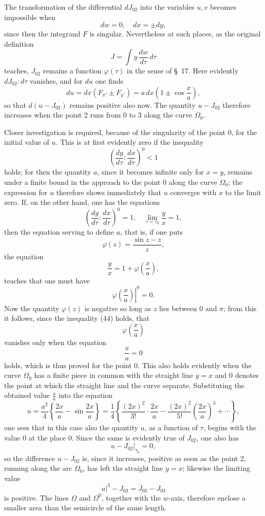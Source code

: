 \documentclass[11pt,a4paper,leqno]{article}
\begin{document}
The transformation of the differential $dJ_{02}$ into the variables $u,v$ becomes impossible when
\[
dw=0,\quad dx=\pm dy,
\]
since then the integrand $F$ is singular. Nevertheless at such places, as the original definition
\[
J=\int y\,\frac{dw}{d\tau}\,d\tau
\]
teaches, $J_{02}$ remains a function $\varphi(\tau)$ in the sense of \S~17. Here evidently $dJ_{02}:d\tau$ vanishes, and for $du$ one finds
\[
du=dx(F_{x'}\pm F_{y'})=a\,dx\left(1\pm\cos\frac{x}{a}\right),
\]
so that $d(u-J_{02})$ remains positive also now. The quantity $u-J_{02}$ therefore increases when the point 2 runs from 0 to 3 along the curve $\Omega_0$.

Closer investigation is required, because of the singularity of the point 0, for the initial value of $u$. This is at first evidently zero if the inequality
\[
\left(\frac{dy}{d\tau}:\frac{dx}{d\tau}\right)^0<1
\]
holds; for then the quantity $a$, since it becomes infinite only for $x=y$, remains under a finite bound in the approach to the point 0 along the curve $\Omega_0$; the expression for $u$ therefore shows immediately that $u$ converges with $x$ to the limit zero. If, on the other hand, one has the equations
\[
\left(\frac{dy}{d\tau}:\frac{dx}{d\tau}\right)^0=1,\quad
\lim_{\tau=\tau_0}\frac{y}{x}=1,
\]
then the equation serving to define $a$, that is, if one puts
\[
\varphi(z)=\frac{\sin z-z}{z},
\]
the equation
\[
\frac{y}{x}=1+\varphi\left(\frac{x}{a}\right),
\]
teaches that one must have
\[
\left.\varphi\left(\frac{x}{a}\right)\right|^0=0.
\]
Now the quantity $\varphi(z)$ is negative so long as $z$ lies between 0 and $\pi$; from this it follows, since the inequality (44) holds, that
\[
\varphi\left(\frac{x}{a}\right)
\]
vanishes only when the equation
\[
\frac{x}{a}=0
\]
holds, which is thus proved for the point 0. This also holds evidently when the curve $\Omega_0$ has a finite piece in common with the straight line $y=x$ and 0 denotes the point at which the straight line and the curve separate. Substituting the obtained value $\frac{x}{a}$ into the equation
\[
u=\frac{a^2}{4}\left\{\frac{2x}{a}-\sin\frac{2x}{a}\right\}
=
\frac{1}{4}\left\{
\frac{(2x)^2}{3!}\cdot\frac{2x}{a}
-
\frac{(2x)^2}{5!}\left(\frac{2x}{a}\right)^3
+\cdots
\right\},
\]
one sees that in this case also the quantity $u$, as a function of $\tau$, begins with the value 0 at the place 0. Since the same is evidently true of $J_{02}$, one also has
\[
\left.u-J_{02}\right|_{\tau_0}=0,
\]
so the difference $u-J_{02}$ is, since it increases, positive as soon as the point 2, running along the arc $\Omega_0$, has left the straight line $y=x$; likewise the limiting value
\[
\left.u\right|^3-J_{03}=\overline{J}_{03}-J_{03}
\]
is positive. The lines $\Omega$ and $\Omega^0$, together with the $w$-axis, therefore enclose a smaller area than the semicircle of the same length.
\end{document}
